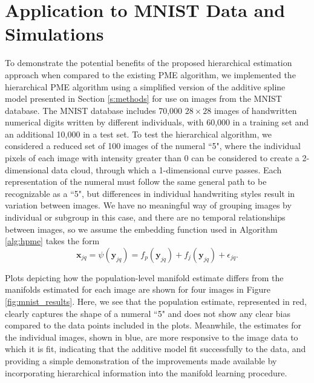 \documentclass[11pt,reqno]{article}
\theoremstyle{definition}
\begin{document}
\section{Application to MNIST Data and Simulations}\label{s:hpme_mnist_simulation}

To demonstrate the potential benefits of the proposed hierarchical estimation approach when compared to the existing PME algorithm, we implemented the hierarchical PME algorithm using a simplified version of the additive spline model presented in Section \ref{s:methods} for use on images from the MNIST database. The MNIST database includes 70,000 $28 \times 28$ images of handwritten numerical digits written by different individuals, with 60,000 in a training set and an additional 10,000 in a test set. To test the hierarchical algorithm, we considered a reduced set of 100 images of the numeral ``5", where the individual pixels of each image with intensity greater than 0 can be considered to create a 2-dimensional data cloud, through which a 1-dimensional curve passes. Each representation of the numeral must follow the same general path to be recognizable as a ``5", but differences in individual handwriting styles result in variation between images. We have no meaningful way of grouping images by individual or subgroup in this case, and there are no temporal relationships between images, so we assume the embedding function used in Algorithm \ref{alg:hpme} takes the form \[%
  \mathbf{x}_{jq} = \psi(\mathbf{y}_{jq}) = f_p(\mathbf{y}_{jq}) + f_j(\mathbf{y}_{jq}) + \epsilon_{jq}
.\]%

Plots depicting how the population-level manifold estimate differs from the manifolds estimated for each image are shown for four images in Figure \ref{fig:mnist_results}. Here, we see that the population estimate, represented in red, clearly captures the shape of a numeral ``5" and does not show any clear bias compared to the data points included in the plots. Meanwhile, the estimates for the individual images, shown in blue, are more responsive to the image data to which it is fit, indicating that the additive model fit successfully to the data, and providing a simple demonstration of the improvements made available by incorporating hierarchical information into the manifold learning procedure.
\end{document}
